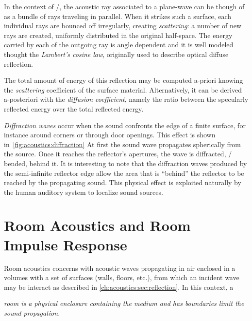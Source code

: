 In the context of \GA/, the acoustic ray associated to a plane-wave can be though of as a bundle of rays traveling in parallel.
When it strikes such a surface, each individual rays are bounced off irregularly, creating \textit{scattering}:
a number of new rays are created, uniformly distributed in the original half-space.
The energy carried by each of the outgoing ray is angle dependent and it
is well modeled thought the \textit{Lambert's cosine law}, originally used to describe optical diffuse reflection.

The total amount of energy of this reflection may be computed a-priori
knowing the \textit{scattering} coefficient of the surface material.
Alternatively, it can be derived a-posteriori with the \textit{diffusion coefficient}, namely the ratio between
the specularly reflected energy over the total reflected energy.

\textit{Diffraction waves} occur when the sound confronts the edge of a finite surface, for instance around corners or through door openings.
This effect is shown in~\cref{fig:acoustics:diffraction}
At first the sound wave propagates spherically from the source.
Once it reaches the reflector's  apertures, the wave is diffracted, \ie/ bended, behind it.
It is interesting to note that the diffraction waves produced by the semi-infinite reflector edge
allow the area that is ``behind'' the reflector to be reached by the propagating sound.
This physical effect is exploited naturally by the human auditory system to localize sound sources.


\section{Room Acoustics and Room Impulse Response}\label{ch:acoustics:sec:rir}
Room acoustics concerns with acoustic waves propagating in air enclosed in a volumes with a set of surfaces
(walls, floors, etc.), from which an incident wave may be interact as described in \cref{ch:acoustics:sec:reflection}.
In this context, a
\begin{center}
    \textit{\emph{room} is a physical enclosure containing the medium and has boundaries limit the sound propagation.}
\end{center}

